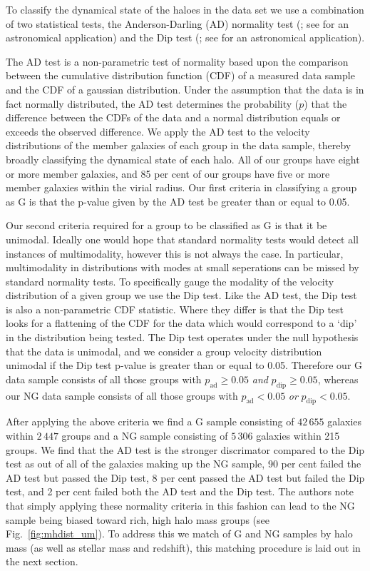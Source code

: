 \documentclass[a4paper,fleqn,usenatbib]{mnras}
\begin{document}
To classify the dynamical state of the haloes in the data set we use a
combination of two statistical tests, the Anderson-Darling (AD)
normality test (\citealt{anderson1952}; see \citealt{hou2009, hou2013}
for an astronomical application) and the Dip test
(\citealt{hartigan1985}; see \citealt{ribeiro2013} for an astronomical
application).
\par
The AD test is a non-parametric test of normality based
upon the comparison between the cumulative distribution function (CDF) of a
measured data sample and the CDF of a gaussian distribution.  Under
the assumption that the data is in fact normally distributed, the AD
test determines the probability ($p$) that the difference between
the CDFs of the data and a normal distribution equals or exceeds the
observed difference.  We apply the AD test to the velocity
distributions of the member galaxies of each group in the data sample,
thereby broadly classifying the dynamical state of each halo.  All of
our groups have eight or more member galaxies, and 85 per cent of our
groups have five or more member galaxies within the virial radius.  Our
first criteria in classifying a group as G is that the p-value given
by the AD test be greater than or equal to 0.05.
\par
Our second criteria required for a
group to be classified as G is that it be unimodal.  Ideally one would
hope that standard normality tests would detect all instances of
multimodality, however this is not always the case.  In particular,
multimodality in distributions with modes at small seperations
can be missed by standard normality tests. To specifically
gauge the modality of the velocity distribution of a given group we
use the Dip test.  Like the AD test, the Dip test is also a
non-parametric CDF statistic.  Where they differ is that the Dip test
looks for a flattening of the CDF for the data which would correspond
to a `dip' in the distribution being tested.  The Dip test operates
under the null hypothesis that the data is unimodal, and we consider a
group velocity distribution unimodal if the Dip test p-value is
greater than or equal to 0.05.  Therefore our G data sample consists
of all those groups with $p_{\text{ad}} \ge 0.05$
\emph{and} $p_{\text{dip}} \ge 0.05$, whereas our NG data
sample consists of all those groups with $p_{\text{ad}} < 0.05$
\emph{or} $p_{\text{dip}} < 0.05$.
\par
After applying the above criteria we find a G sample consisting of
$42\,655$ galaxies within $2\,447$ groups and a NG sample consisting of $5\,306$
galaxies within 215 groups.  We find that the AD test is the stronger discrimator
compared to the Dip test as out of all of the galaxies making up the
NG sample, 90 per cent failed the AD test but passed the Dip test, 8
per cent passed the AD test but failed the Dip test, and 2 per cent
failed both the AD test and the Dip test.  The authors note that simply applying
these normality criteria in this fashion can lead to the NG sample
being biased toward rich, high halo mass groups (see
Fig.~\ref{fig:mhdist_um}).  To address this we
match of G and NG samples by halo mass (as well as stellar mass and
redshift), this matching procedure is laid out in the next section.
\end{document}

